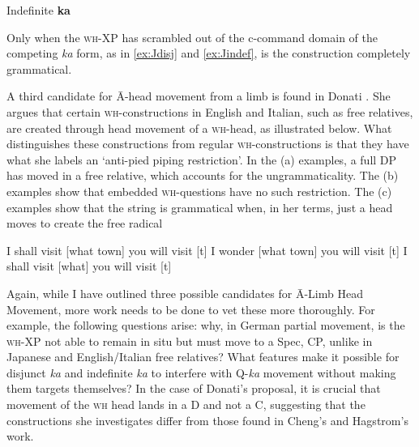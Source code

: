 \documentclass[output=paper,colorlinks,citecolor=brown,
]{langscibook}
\begin{document}
\ea Indefinite \textbf{ka} \label{ex:indefiniteka}

Only when the \textsc{wh}-XP has scrambled out of the c-command domain of the competing \textit{ka} form, as in \ref{ex:Jdisj} and \ref{ex:Jindef}, is the construction completely grammatical.

A third candidate for \=A-head movement from a limb is found in Donati \citeyearpar{Donati:2006}.  She argues that certain \textsc{wh}-constructions in English and Italian, such as free relatives, are created through head movement of a \textsc{wh}-head, as illustrated below.  What distinguishes these constructions from regular \textsc{wh}-constructions is that they have what she labels an `anti-pied piping restriction'.  In the (a) examples, a full DP has moved in a free relative, which accounts for the ungrammaticality.  The (b) examples show that embedded \textsc{wh}-questions have no such restriction. The (c) examples show that the string is grammatical when, in her terms, just a head moves to create the free radical

\ea 
{}

\ea 
\ea *I shall visit [what town] you will visit [t]
\ex I wonder [what town] you will visit [t]
\ex I shall visit [what] you will visit [t]

Again, while I have outlined three possible candidates for \=A-Limb Head Movement, more work needs to be done to vet these more thoroughly.  For example, the following questions arise: why, in German partial movement, is the \textsc{wh}-XP not able to remain in situ but must move to a Spec, CP, unlike in Japanese and English/Italian free relatives? What features make it possible for disjunct \textit{ka} and indefinite \textit{ka} to interfere with Q-\textit{ka} movement without making them targets themselves?  In the case of Donati's proposal, it is crucial that movement of the \textsc{wh} head lands in a D and not a C, suggesting that the constructions she investigates differ from those found in Cheng's and Hagstrom's work.
\end{document}
